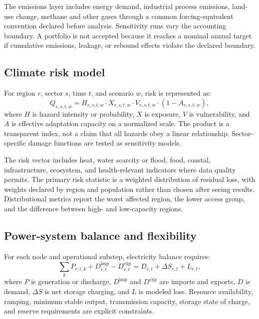 \documentclass[conference]{IEEEtran}
\begin{document}
The emissions layer includes energy demand, industrial process emissions, land-use change, methane and other gases through a common forcing-equivalent convention declared before analysis. Sensitivity runs vary the accounting boundary. A portfolio is not accepted because it reaches a nominal annual target if cumulative emissions, leakage, or rebound effects violate the declared boundary.

\subsection{Climate risk model}
For region $r$, sector $s$, time $t$, and scenario $w$, risk is represented as:
\begin{equation}
Q_{r,s,t,w}=H_{r,s,t,w}\cdot X_{r,s,t,w}\cdot V_{r,s,t,w}\cdot (1-A_{r,s,t,w}),
\label{eq:risk}
\end{equation}
where $H$ is hazard intensity or probability, $X$ is exposure, $V$ is vulnerability, and $A$ is effective adaptation capacity on a normalized scale. The product is a transparent index, not a claim that all hazards obey a linear relationship. Sector-specific damage functions are tested as sensitivity models.

The risk vector includes heat, water scarcity or flood, food, coastal, infrastructure, ecosystem, and health-relevant indicators where data quality permits. The primary risk statistic is a weighted distribution of residual loss, with weights declared by region and population rather than chosen after seeing results. Distributional metrics report the worst affected region, the lower access group, and the difference between high- and low-capacity regions.

\subsection{Power-system balance and flexibility}
For each node and operational substep, electricity balance requires:
\begin{equation}
\sum_k P_{r,t,k}+D^{\mathrm{imp}}_{r,t}-D^{\mathrm{exp}}_{r,t}
=D_{r,t}+\Delta S_{r,t}+L_{r,t},
\label{eq:balance}
\end{equation}
where $P$ is generation or discharge, $D^{\mathrm{imp}}$ and $D^{\mathrm{exp}}$ are imports and exports, $D$ is demand, $\Delta S$ is net storage charging, and $L$ is modeled loss. Resource availability, ramping, minimum stable output, transmission capacity, storage state of charge, and reserve requirements are explicit constraints.
\end{document}

